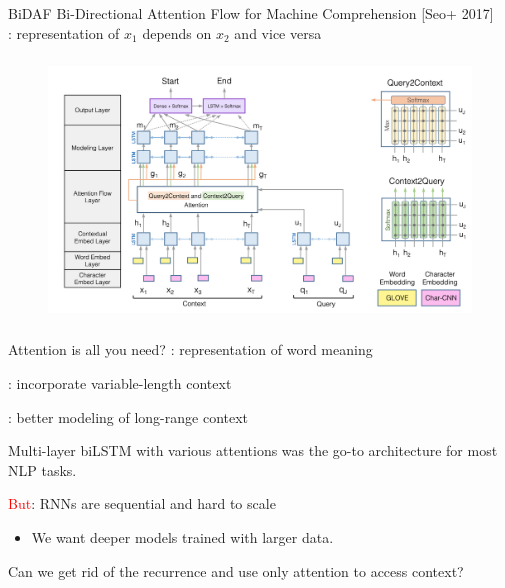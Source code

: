 \documentclass[usenames,dvipsnames,notes]{beamer}
\begin{document}
\begin{frame}
    {BiDAF}
    Bi-Directional Attention Flow for Machine Comprehension [Seo+ 2017]\\
    : representation of $x_1$ depends on $x_2$ and vice versa
    \vspace{-1em}
    \begin{figure}
        \includegraphics[height=7cm]{figures/bidaf}
    \end{figure}
\end{frame}

\begin{frame}
    {Attention is all you need?}
    : representation of word meaning

    : incorporate variable-length context

    : better modeling of long-range context

    Multi-layer biLSTM with various attentions was the go-to architecture for most NLP tasks.

    \textcolor{red}{But}: RNNs are sequential and hard to scale\\
    \begin{itemize}
        \item[] We want deeper models trained with larger data.
    \end{itemize}

    Can we get rid of the recurrence and use only attention to access context?
\end{frame}
\end{document}
